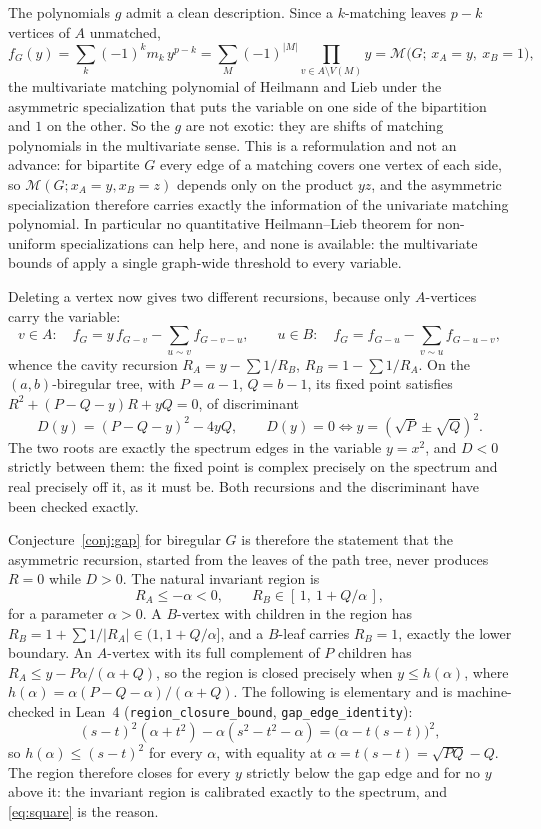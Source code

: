 \documentclass[11pt]{article}
\theoremstyle{remark}
\begin{document}
The polynomials $g$ admit a clean description. Since a $k$-matching leaves $p-k$
vertices of $A$ unmatched,
\begin{equation}\label{eq:multivar}
f_G(y)=\sum_{k}(-1)^k m_k\,y^{p-k}
=\sum_{M}(-1)^{|M|}\prod_{v\in A\setminus V(M)}y
=\mathcal M\bigl(G;\,x_A=y,\ x_B=1\bigr),
\end{equation}
the multivariate matching polynomial of Heilmann and Lieb under the asymmetric
specialization that puts the variable on one side of the bipartition and $1$ on
the other. So the $g$ are not exotic: they are shifts of matching polynomials in
the multivariate sense. This is a reformulation and not an advance: for
bipartite $G$ every edge of a matching covers one vertex of each side, so
$\mathcal M(G;x_A=y,x_B=z)$ depends only on the product $yz$, and the asymmetric
specialization therefore carries exactly the information of the univariate
matching polynomial. In particular no quantitative Heilmann--Lieb theorem for
non-uniform specializations can help here, and none is available: the
multivariate bounds of \cite{HL} apply a single graph-wide threshold to every
variable.

Deleting a vertex now gives two different recursions, because only $A$-vertices
carry the variable:
\[
v\in A:\quad f_G=y\,f_{G-v}-\!\!\sum_{u\sim v}\!f_{G-v-u},
\qquad
u\in B:\quad f_G=f_{G-u}-\!\!\sum_{v\sim u}\!f_{G-u-v},
\]
whence the cavity recursion
$R_A=y-\sum1/R_B$, $R_B=1-\sum1/R_A$. On the $(a,b)$-biregular tree, with
$P=a-1$, $Q=b-1$, its fixed point satisfies $R^2+(P-Q-y)R+yQ=0$, of
discriminant
\[
D(y)=(P-Q-y)^2-4yQ,
\qquad
D(y)=0\iff y=(\sqrt P\pm\sqrt Q)^2 .
\]
The two roots are exactly the spectrum edges in the variable $y=x^2$, and $D<0$
strictly between them: the fixed point is complex precisely on the spectrum and
real precisely off it, as it must be. Both recursions and the discriminant have
been checked exactly.

Conjecture~\ref{conj:gap} for biregular $G$ is therefore the statement that the
asymmetric recursion, started from the leaves of the path tree, never produces
$R=0$ while $D>0$. The natural invariant region is
\[
R_A\le-\alpha<0,\qquad R_B\in[\,1,\ 1+Q/\alpha\,],
\]
for a parameter $\alpha>0$. A $B$-vertex with children in the region has
$R_B=1+\sum1/|R_A|\in(1,1+Q/\alpha]$, and a $B$-leaf carries $R_B=1$, exactly
the lower boundary. An $A$-vertex with its full complement of $P$ children has
$R_A\le y-P\alpha/(\alpha+Q)$, so the region is closed precisely when
$y\le h(\alpha)$, where $h(\alpha)=\alpha(P-Q-\alpha)/(\alpha+Q)$. The
following is elementary and is machine-checked in Lean~4
(\texttt{region\_closure\_bound}, \texttt{gap\_edge\_identity}):
\begin{equation}\label{eq:square}
(s-t)^2(\alpha+t^2)-\alpha(s^2-t^2-\alpha)=\bigl(\alpha-t(s-t)\bigr)^2 ,
\end{equation}
so $h(\alpha)\le(s-t)^2$ for every $\alpha$, with equality at
$\alpha=t(s-t)=\sqrt{PQ}-Q$. The region therefore closes for every $y$ strictly
below the gap edge and for no $y$ above it: the invariant region is calibrated
exactly to the spectrum, and \eqref{eq:square} is the reason.
\end{document}
